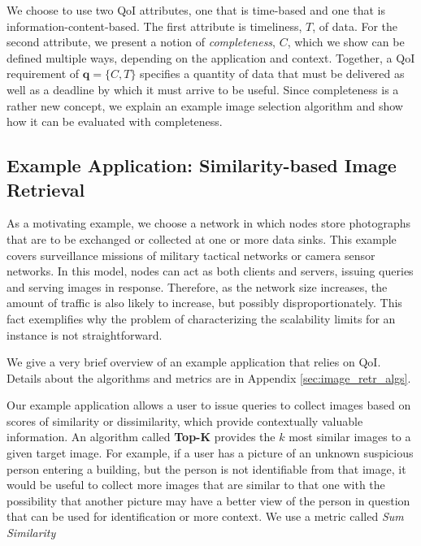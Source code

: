 We choose to use two QoI attributes, one that is time-based and one that is information-content-based.  The first attribute is timeliness, $T$, of data.  For the second attribute, we present a notion of \emph{completeness}, $C$, which we show can be defined multiple ways, depending on the application and context.  Together, a QoI requirement of $\mathbf{q} = \{C,T\}$ specifies a quantity of data that must be delivered as well as a deadline by which it must arrive to be useful.  Since completeness is a rather new concept, we explain an example image selection algorithm and show how it can be evaluated with completeness.

\subsection{Example Application: Similarity-based Image Retrieval}

As a motivating example, we choose a network in which nodes store photographs that are to be exchanged or collected at one or more data sinks.  This example covers surveillance missions of military tactical networks or camera sensor networks.  In this model, nodes can act as both clients and servers, issuing queries and serving images in response.  Therefore, as the network size increases, the amount of traffic is also likely to increase, but possibly disproportionately.  This fact exemplifies why the problem of characterizing the scalability limits for an instance is not straightforward.

We give a very brief overview of an example application that relies on QoI. Details about the algorithms and metrics are in Appendix \ref{sec:image_retr_algs}.

Our example application allows a user to issue queries to collect images based on scores of similarity or dissimilarity, which provide contextually valuable information. An algorithm called {\bf Top-K} provides the $k$ most similar images to a given target image. For example, if a user has a picture of an unknown suspicious person entering a building, but the person is not identifiable from that image, it would be useful to collect more images that are similar to that one with the possibility that another picture may have a better view of the person in question that can be used for identification or more context. We use a metric called \emph{Sum Similarity}

